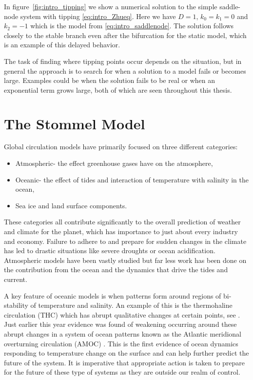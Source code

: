 In figure~\ref{fig:intro_tipping} we show a numerical solution to the simple saddle-node system with tipping \eqref{eq:intro_Zhueq}. Here we have $D=1$, $k_0=k_1=0$ and $k_2=-1$ which is the model from \eqref{eq:intro_saddlenode}. The solution follows closely to the stable branch even after the bifurcation for the static model, which is an example of this delayed behavior.


The task of finding where tipping points occur depends on the situation, but in general the approach is to search for when a solution to a model fails or becomes large. Examples could be when the solution fails to be real or when an exponential term grows large, both of which are seen throughout this thesis.


\section*{The Stommel Model}

Global circulation models have primarily focused on three different categories: 
\begin{itemize}
\item Atmospheric- the effect greenhouse gases have on the atmosphere,
\item Oceanic- the effect of tides and interaction of temperature with salinity in the ocean,
\item Sea ice and land surface components.
\end{itemize}
These categories all contribute significantly to the overall prediction of weather and climate for the planet, which has importance to just about every industry and economy. Failure to adhere to and prepare for sudden changes in the climate has led to drastic situations like severe droughts or ocean acidification. Atmospheric models have been vastly studied but far less work has been done on the contribution from the ocean and the dynamics that drive the tides and current.

A key feature of oceanic models is when patterns form around regions of bi-stability of temperature and salinity. An example of this is the thermohaline circulation (THC) which has abrupt qualitative changes at certain points, see \cite{alley2003abrupt,marotzke2000abrupt,rahmstorf2000thermohaline,rahmstorf2002ocean}. Just earlier this year evidence was found of weakening occurring around these abrupt changes in a system of ocean patterns known as the Atlantic meridional overturning circulation (AMOC) \cite{caesar2018AMOC}. This is the first evidence of ocean dynamics responding to temperature change on the surface and can help further predict the future of the system. It is imperative that appropriate action is taken to prepare for the future of these type of systems as they are outside our realm of control. 

